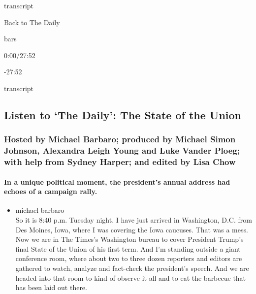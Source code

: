 transcript

Back to The Daily

bars

0:00/27:52

-27:52

transcript

\hypertarget{listen-to-the-daily-the-state-of-the-union-1}{%
\subsection{Listen to `The Daily': The State of the
Union}\label{listen-to-the-daily-the-state-of-the-union-1}}

\hypertarget{hosted-by-michael-barbaro-produced-by-michael-simon-johnson-alexandra-leigh-young-and-luke-vander-ploeg-with-help-from-sydney-harper-and-edited-by-lisa-chow}{%
\subsubsection{Hosted by Michael Barbaro; produced by Michael Simon
Johnson, Alexandra Leigh Young and Luke Vander Ploeg; with help from
Sydney Harper; and edited by Lisa
Chow}\label{hosted-by-michael-barbaro-produced-by-michael-simon-johnson-alexandra-leigh-young-and-luke-vander-ploeg-with-help-from-sydney-harper-and-edited-by-lisa-chow}}

\hypertarget{in-a-unique-political-moment-the-presidents-annual-address-had-echoes-of-a-campaign-rally}{%
\paragraph{In a unique political moment, the president's annual address
had echoes of a campaign
rally.}\label{in-a-unique-political-moment-the-presidents-annual-address-had-echoes-of-a-campaign-rally}}

\begin{itemize}
\tightlist
\item
  michael barbaro\\
  So it is 8:40 p.m. Tuesday night. I have just arrived in Washington,
  D.C. from Des Moines, Iowa, where I was covering the Iowa caucuses.
  That was a mess. Now we are in The Times's Washington bureau to cover
  President Trump's final State of the Union of his first term. And I'm
  standing outside a giant conference room, where about two to three
  dozen reporters and editors are gathered to watch, analyze and
  fact-check the president's speech. And we are headed into that room to
  kind of observe it all and to eat the barbecue that has been laid out
  there.
\end{itemize}

